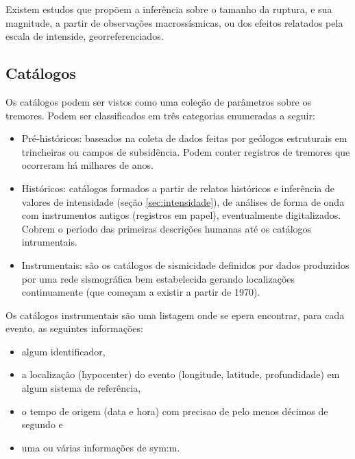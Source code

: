 Existem estudos \citep{bakun_1999} que propõem a inferência sobre o tamanho da ruptura, e sua
magnitude, a partir de observações macrossísmicas, ou dos efeitos relatados pela escala de intenside, georreferenciados.


\subsection{Catálogos}
\label{sec:catalogos}

Os catálogos podem ser vistos como uma coleção de parâmetros sobre os tremores. 
Podem ser classificados em três categorias \citep{woessner_2010} enumeradas a seguir:

\begin{itemize}\setlength{\itemsep}{0em}
	\item Pré-históricos: baseados na coleta de dados feitas por 
	geólogos estruturais em trincheiras ou campos de subsidência. Podem conter registros de tremores que ocorreram 
	há milhares de anos.
	\item Históricos: catálogos formados a partir de relatos históricos e inferência de valores de intensidade
	(seção \ref{sec:intensidade}), de análises de forma de onda com instrumentos antigos (registros em papel), eventualmente
	digitalizados.
	Cobrem o período das primeiras descrições humanas até os catálogos intrumentais.
	\item Instrumentais: são os catálogos de sismicidade definidos por dados produzidos por uma rede sismográfica bem estabelecida
	 gerando localizações continuamente (que começam a existir a partir de 1970).
\end{itemize} 

Os catálogos instrumentais são uma listagem onde se epera encontrar, para cada evento, as
seguintes informações:

\begin{itemize}\setlength{\itemsep}{0em}
	\item algum identificador,
	\item a localização (\gls{hypocenter}) do evento (longitude, latitude, profundidade) em algum sistema de referência,
	\item o tempo de origem (data e hora) com precisao de pelo menos décimos de segundo e
	\item uma ou várias informações de \glsdesc{sym:m}.
\end{itemize} 

